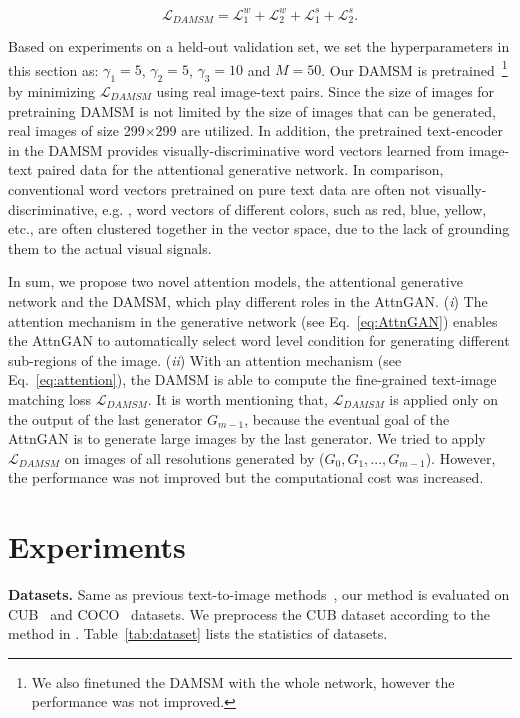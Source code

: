 {\begin{equation}
   \mathcal{L}_{DAMSM} = \mathcal{L}^{w}_{1} + \mathcal{L}^{w}_{2} + \mathcal{L}^{s}_{1} + \mathcal{L}^{s}_{2}.

 \end{equation}

Based on experiments on a held-out validation set, we set the hyperparameters in this section as: $\gamma_{1} = 5$, $\gamma_{2} = 5$, $\gamma_{3} = 10$ and $M=50$. Our DAMSM is pretrained~\footnote{We also finetuned the DAMSM with the whole network, however the performance was not improved.} by minimizing $\mathcal{L}_{DAMSM}$ using real image-text pairs. Since the size of images for pretraining DAMSM is not limited by the size of images that can be generated, real images of size 299$\times$299 are utilized. In addition, the pretrained text-encoder in the DAMSM provides visually-discriminative word vectors learned from image-text paired data for the attentional generative network. In comparison, conventional word vectors pretrained on pure text data are often not visually-discriminative, e.g. , word vectors of different colors, such as red, blue, yellow, etc., are often clustered together in the vector space, due to the lack of grounding them to the actual visual signals. }

In sum, we propose two novel attention models, the attentional generative network and the DAMSM, which play different roles in the AttnGAN. (\textit{i}) The attention mechanism in the generative network (see Eq.~\ref{eq:AttnGAN}) enables the AttnGAN to automatically select word level condition for generating different sub-regions of the image. (\textit{ii}) With an attention mechanism (see Eq.~\ref{eq:attention}), the DAMSM is able to compute the fine-grained text-image matching loss $\mathcal{L}_{DAMSM}$. It is worth mentioning that, $\mathcal{L}_{DAMSM}$ is applied only on the output of the last generator $G_{m-1}$, because the eventual goal of the AttnGAN is to generate large images by the last generator. We tried to apply $\mathcal{L}_{DAMSM}$ on images of all resolutions generated by ($G_0, G_1, ..., G_{m-1}$).  However, the performance was not improved but the computational cost was increased. 

\section{Experiments}

\textbf{Datasets. }{ Same as previous text-to-image methods~\cite{Han16stackgan,Han17stackgan2,reed2016generative,reed2016learning}, our method is evaluated on CUB~\cite{WahCUB_200_2011} and COCO~\cite{LinMBHPRDZ14} datasets. We preprocess the CUB dataset according to the method in \cite{Han16stackgan}.  
Table~\ref{tab:dataset} lists the statistics of datasets. }

